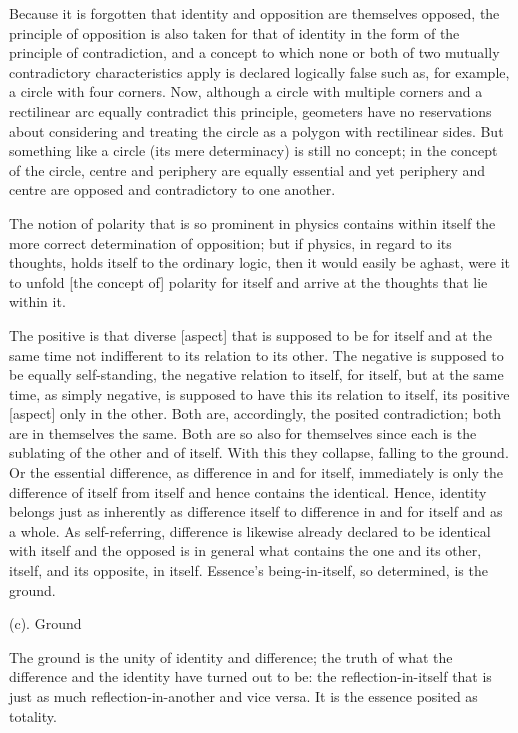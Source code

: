     Because it is forgotten that identity and opposition are themselves opposed,
    the principle of opposition is also taken for that of identity
    in the form of the principle of contradiction, and
    a concept to which none or both of two mutually
    contradictory characteristics apply is declared logically false
    such as, for example, a circle with four corners.
    Now, although a circle with multiple corners and a rectilinear arc
    equally contradict this principle, geometers have no reservations about
    considering and treating the circle as a polygon with rectilinear sides.
    But something like a circle (its mere determinacy) is still no concept;
    in the concept of the circle, centre and periphery are equally essential and
    yet periphery and centre are opposed and contradictory to one another.

    The notion of polarity that is so prominent in physics contains
    within itself the more correct determination of opposition;
    but if physics, in regard to its thoughts, holds itself to the ordinary logic,
    then it would easily be aghast, were it to unfold [the concept of]
    polarity for itself and arrive at the thoughts that lie within it.

The positive is that diverse [aspect]
that is supposed to be for itself and at the same time
not indifferent to its relation to its other.
The negative is supposed to be equally self-standing,
the negative relation to itself, for itself,
but at the same time, as simply negative,
is supposed to have this its relation to itself,
its positive [aspect] only in the other.
Both are, accordingly, the posited contradiction;
both are in themselves the same.
Both are so also for themselves since each is
the sublating of the other and of itself.
With this they collapse, falling to the ground.
Or the essential difference, as difference in and for itself,
immediately is only the difference of itself from itself
and hence contains the identical.
Hence, identity belongs just as inherently as difference itself
to difference in and for itself and as a whole.
As self-referring, difference is likewise already
declared to be identical with itself and
the opposed is in general what contains the one and its other,
itself, and its opposite, in itself.
Essence's being-in-itself, so determined, is the ground.

(c). Ground

The ground is the unity of identity and difference;
the truth of what the difference and the identity have turned out to be:
the reflection-in-itself that is just as much reflection-in-another and vice versa.
It is the essence posited as totality.

